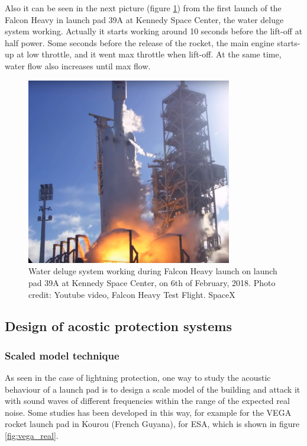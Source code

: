Also it can be seen in the next picture (figure \ref{fig:fh_launch}) from the
first launch of the Falcon Heavy in launch pad 39A at Kennedy Space Center, the
water deluge system working. Actually it starts working around 10 seconds before
the lift-off at half power. Some seconds before the release of the rocket, the main
engine starts-up at low throttle, and it went max throttle when lift-off. At the
same time, water flow also increases until max flow.

\begin{figure}[h]
	\centering
	\includegraphics[width=0.8\textwidth]{img/falcon_heavy.png}
	\caption[Falcon Heavy Launch]
	{Water deluge system working during Falcon Heavy launch on launch pad 39A
	at Kennedy Space Center, on 6th of February, 2018. Photo credit: Youtube
	video, Falcon Heavy Test Flight. SpaceX}
	\label{fig:fh_launch}
\end{figure}

\subsection{Design of acostic protection systems}

\subsubsection{Scaled model technique}

As seen in the case of lightning protection, one way to study the acoustic behaviour
of a launch pad is to design a scale model of the building and attack it with sound
waves of different frequencies within the range of the expected real noise.
Some studies \cite{2016Pico} has been developed in this way, for example for the VEGA rocket launch
pad in Kourou (French Guyana), for ESA, which is shown in figure \ref{fig:vega_real}.

